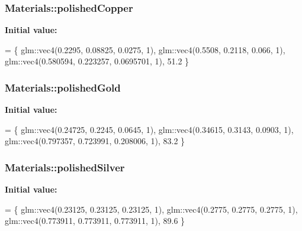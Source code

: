 \subsubsection[{\texorpdfstring{polished\+Copper}{polishedCopper}}]{ Materials\+::polished\+Copper}\hypertarget{namespace_materials_a2140516cc8e291d497ac00dbd73d8fbd}{}\label{namespace_materials_a2140516cc8e291d497ac00dbd73d8fbd}
{\bfseries Initial value\+:}
\begin{DoxyCode}
= \{
        glm::vec4(0.2295, 0.08825, 0.0275, 1),
        glm::vec4(0.5508, 0.2118, 0.066, 1),
        glm::vec4(0.580594, 0.223257, 0.0695701, 1),
        51.2
    \}
\end{DoxyCode}
\subsubsection[{\texorpdfstring{polished\+Gold}{polishedGold}}]{ Materials\+::polished\+Gold}\hypertarget{namespace_materials_a714fa575786b960faa0e02dac82a4435}{}\label{namespace_materials_a714fa575786b960faa0e02dac82a4435}
{\bfseries Initial value\+:}
\begin{DoxyCode}
= \{
        glm::vec4(0.24725, 0.2245, 0.0645, 1),
        glm::vec4(0.34615, 0.3143, 0.0903, 1),
        glm::vec4(0.797357, 0.723991, 0.208006, 1),
        83.2
    \}
\end{DoxyCode}
\subsubsection[{\texorpdfstring{polished\+Silver}{polishedSilver}}]{ Materials\+::polished\+Silver}\hypertarget{namespace_materials_aca88f7adaadc3a3bbfce3dea0c276451}{}\label{namespace_materials_aca88f7adaadc3a3bbfce3dea0c276451}
{\bfseries Initial value\+:}
\begin{DoxyCode}
= \{
        glm::vec4(0.23125, 0.23125, 0.23125, 1),
        glm::vec4(0.2775, 0.2775, 0.2775, 1),
        glm::vec4(0.773911, 0.773911, 0.773911, 1),
        89.6
    \}
\end{DoxyCode}
